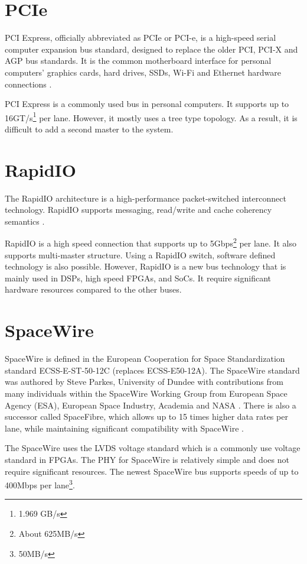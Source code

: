 \documentclass[12pt,article]{memoir}
\begin{document}
\section{PCIe}
PCI Express, officially abbreviated as PCIe or PCI-e, is a high-speed serial computer expansion bus standard, designed to replace the older PCI, PCI-X and AGP bus standards. It is the common motherboard interface for personal computers' graphics cards, hard drives, SSDs, Wi-Fi and Ethernet hardware connections \cite{MR:PCIe}.\par
PCI Express is a commonly used bus in personal computers. It supports up to 16GT/s\footnote{1.969 GB/s} per lane. However, it mostly uses a tree type topology. As a result, it is difficult to add a second master to the system.

\section{RapidIO}
The RapidIO architecture is a high-performance packet-switched interconnect technology. RapidIO supports messaging, read/write and cache coherency semantics \cite{RapidIO:RapidIO}.\par
RapidIO is a high speed connection that supports up to 5Gbps\footnote{About 625MB/s} per lane. It also supports multi-master structure. Using a RapidIO switch, software defined technology is also possible. However, RapidIO is a new bus technology that is mainly used in DSPs, high speed FPGAs, and SoCs. It require significant hardware resources compared to the other buses.

\section{SpaceWire}
SpaceWire is defined in the European Cooperation for Space Standardization standard ECSS-E-ST-50-12C (replaces ECSS-E50-12A). The SpaceWire standard was authored by Steve Parkes, University of Dundee with contributions from many individuals within the SpaceWire Working Group from European Space Agency (ESA), European Space Industry, Academia and NASA \cite{ESA:SpaceWire}. There is also a successor called SpaceFibre, which allows up to 15 times higher data rates per lane, while maintaining significant compatibility with SpaceWire \cite{ESA:SpaceFibre}.\par
The SpaceWire uses the LVDS voltage standard which is a commonly use voltage standard in FPGAs. The PHY for SpaceWire is relatively simple and does not require significant resources. The newest SpaceWire bus supports speeds of up to 400Mbps per lane\footnote{50MB/s}. 
\end{document}
